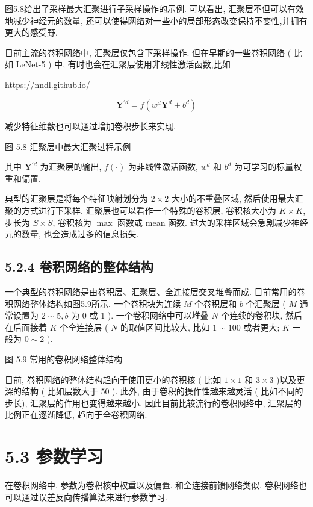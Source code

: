 \documentclass[10pt]{article}
\begin{document}
图5.8给出了采样最大汇聚进行子采样操作的示例. 可以看出, 汇聚层不但可以有效地减少神经元的数量, 还可以使得网络对一些小的局部形态改变保持不变性,并拥有更大的感受野.

目前主流的卷积网络中, 汇聚层仅包含下采样操作. 但在早期的一些卷积网络 ( 比如 LeNet-5 ) 中, 有时也会在汇聚层使用非线性激活函数,比如

\href{https://nndl.github.io/}{https://nndl.github.io/}


\begin{equation*}
\boldsymbol{Y}^{\prime d}=f\left(w^{d} \boldsymbol{Y}^{d}+b^{d}\right) \tag{5.27}
\end{equation*}


减少特征维数也可以通过增加卷积步长来实现.



图 5.8 汇聚层中最大汇聚过程示例

其中 $\boldsymbol{Y}^{\prime d}$ 为汇聚层的输出, $f(\cdot)$ 为非线性激活函数, $w^{d}$ 和 $b^{d}$ 为可学习的标量权重和偏置.

典型的汇聚层是将每个特征映射划分为 $2 \times 2$ 大小的不重叠区域, 然后使用最大汇聚的方式进行下采样. 汇聚层也可以看作一个特殊的卷积层, 卷积核大小为 $K \times K$, 步长为 $S \times S$, 卷积核为 $\max$ 函数或 mean 函数. 过大的采样区域会急剧减少神经元的数量, 也会造成过多的信息损失.

\subsection*{5.2.4 卷积网络的整体结构}
一个典型的卷积网络是由卷积层、汇聚层、全连接层交叉堆叠而成. 目前常用的卷积网络整体结构如图5.9所示. 一个卷积块为连续 $M$ 个卷积层和 $b$ 个汇聚层 ( $M$ 通常设置为 $2 \sim 5, b$ 为 0 或 1 ). 一个卷积网络中可以堆叠 $N$ 个连续的卷积块, 然后在后面接着 $K$ 个全连接层 ( $N$ 的取值区间比较大, 比如 $1 \sim 100$ 或者更大; $K$ 一般为 $0 \sim 2$ ).



图 5.9 常用的卷积网络整体结构

目前, 卷积网络的整体结构趋向于使用更小的卷积核 $($ 比如 $1 \times 1$ 和 $3 \times 3$ )以及更深的结构 ( 比如层数大于 50 ). 此外, 由于卷积的操作性越来越灵活 ( 比如不同的步长), 汇聚层的作用也变得越来越小, 因此目前比较流行的卷积网络中, 汇聚层的比例正在逐渐降低, 趋向于全卷积网络.

\section*{5.3 参数学习}
在卷积网络中, 参数为卷积核中权重以及偏置. 和全连接前馈网络类似, 卷积网络也可以通过误差反向传播算法来进行参数学习.
\end{document}
